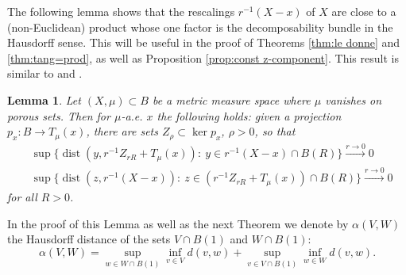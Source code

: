 \documentclass{amsart}
\newtheorem{lemma}[theorem]{Lemma}
\numberwithin{equation}{section}
\newcommand{\dist}{\operatorname{dist}}
\newcommand{\inv}{^{-1}}
\begin{document}
The following lemma shows that the rescalings $r\inv(X-x)$ of $X$ are close to a (non-Euclidean) product whose one factor is the decomposability bundle in the Hausdorff sense. This will be useful in the proof of Theorems \ref{thm:le donne} and \ref{thm:tang=prod}, as well as Proposition \ref{prop:const z-component}. This result is similar to \cite[Proposition 2.9]{delninmerlo} and \cite[Theorem 1.2]{davideb20}.

\begin{lemma}\label{lem:e-close-to-product}
Let $(X,\mu)\subset B$ be a metric measure space where $\mu$ vanishes on porous sets. Then for $\mu$-a.e. $x$ the following holds: given a projection $p_x:B\to T_\mu(x)$, there are sets $Z_\rho\subset \ker p_x$, $\rho>0$, so that 
\begin{align}
&\sup\{\dist(y,r\inv Z_{rR}+T_\mu(x)):\ y\in r\inv(X-x)\cap B(R)\}\stackrel{r\to 0}{\longrightarrow} 0\label{eq:e1}\\
&\sup\{\dist(z,r\inv(X-x)):\ z\in (r\inv Z_{rR}+T_\mu(x))\cap B(R)\}\stackrel{r\to 0}{\longrightarrow} 0\label{eq:e2}
\end{align}
for all $R>0$.
\end{lemma}
In the proof of this Lemma as well as the next Theorem we  denote by $\alpha(V,W)$ the Hausdorff distance of the sets $V\cap B(1)$ and $W\cap B(1)$: 
\[
\alpha(V,W)=\sup_{w\in W\cap B(1)}\inf_{v\in V} d(v,w) + \sup_{v\in V\cap B(1)}\inf_{w\in W} d(v,w).
\]
\end{document}
